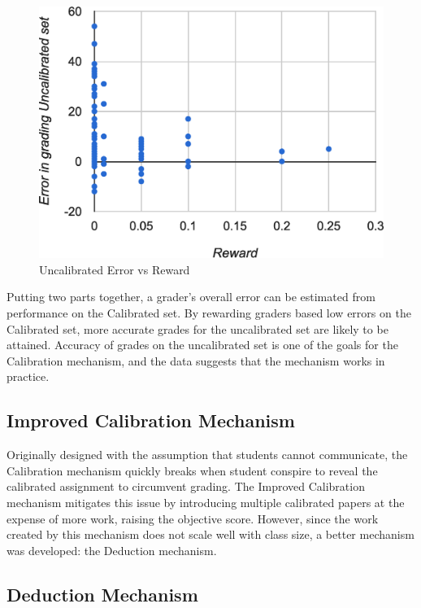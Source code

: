 \documentclass{chi-ext}
\begin{document}
\begin{figure}
  \centering
  \includegraphics[width=\linewidth]{Reward-Error-Graph.eps}
  \caption{Uncalibrated Error vs Reward}
  \label{fig:reward-error}
\end{figure}

Putting two parts together, a grader's overall error can be estimated from performance on the Calibrated set. By rewarding graders based low errors on the Calibrated set, more accurate grades for the uncalibrated set are likely to be attained. Accuracy of grades on the uncalibrated set is one of the goals for the Calibration mechanism, and the data suggests that the mechanism works in practice.

\subsection{Improved Calibration Mechanism}
Originally designed with the assumption that students cannot communicate, the Calibration mechanism quickly breaks when student conspire to reveal the calibrated assignment to circumvent grading. The Improved Calibration mechanism mitigates this issue by introducing multiple calibrated papers at the expense of more work, raising the objective score. However, since the work created by this mechanism does not scale well with class size, a better mechanism was developed: the Deduction mechanism.

\subsection{Deduction Mechanism}
\end{document}

